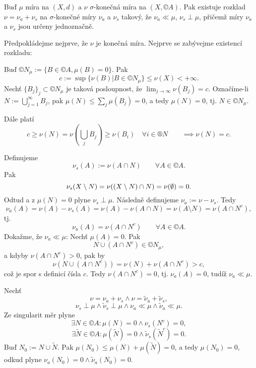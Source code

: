 \documentclass[12pt]{article}					%
\begin{document}

\begin{veta}
	Buď $\mu$ míra na $(X, d)$ a $\nu$ $\sigma$-konečná míra na $(X, ©A)$. Pak existuje rozklad $\nu = \nu_a + \nu_s$ na $\sigma$-konečné míry $\nu_a$ a $\nu_s$ takový, že $\nu_a \ll \mu$, $\nu_s \perp \mu$, přičemž míry $\nu_a$ a $\nu_s$ jsou určeny jednoznačně.

	\begin{dukazin}
		Předpokládejme nejprve, že $\nu$ je konečná míra. Nejprve se zabývejme existencí rozkladu:

		Buď $©N_\mu := \{B \in ©A, \mu(B) = 0\}$. Pak
		$$ c := \sup \{\nu(B) | B \in ©N_\mu\} ≤ \nu(X) < +∞. $$
		Nechť $\{B_j\}_j \subset ©N_\mu$ je taková posloupnost, že $\lim_{j \rightarrow ∞} \nu(B_j) = c$. Označíme-li $N := \bigcup_{j=1}^∞ B_j$, pak $\mu(N) ≤ \sum_j \mu(B_j) = 0$, a tedy $\mu(N) = 0$, tj. $N \in ©N_\mu$.

		Dále platí
		$$ c ≥ \nu(N) = \nu(\bigcup_j B_j) ≥ \nu(B_i) \quad \forall i \in ®N \qquad \implies \nu(N) = c. $$

		Definujeme
		$$ \nu_s(A) := \nu(A \cap N) \qquad \forall A \in ©A. $$
		Pak
		$$ \nu_s(X \setminus N) = \nu((X \setminus N) \cap N) = \nu(\emptyset) = 0. $$
		Odtud a z $\mu(N) = 0$ plyne $\nu_s \perp \mu$. Následně definujeme $\nu_a := \nu - \nu_s$. Tedy
		$$ \nu_a(A) = \nu(A) - \nu_s(A) = \nu(A) - \nu(A \cap N) = \nu(A \setminus N) = \nu(A \cap N^c), $$
		tj.
		$$ \nu_a(A) = \nu(A \cap N^c) \qquad \forall A \in ©A. $$
		Dokažme, že $\nu_a \ll \mu$: Nechť $\mu(A) = 0$. Pak
		$$ N \cup (A \cap N^c) \in ©N_\mu, $$
		a kdyby $\nu(A \cap N^c) > 0$, pak by
		$$ \nu(N \cup (A \cap N^c)) = \nu(N) + \nu(A \cap N^c) > c, $$
		což je spor s definicí čísla $c$. Tedy $\nu(A \cap N^c) = 0$, tj. $\nu_a(A) = 0$, tudíž $\nu_a \ll \mu$.
	\end{dukazin}

	\begin{dukazin}
		Nechť
		$$ \nu = \nu_a + \nu_s \land \nu = \tilde \nu_a + \tilde \nu_s, $$
		$$ \nu_s \perp \mu \land \tilde \nu_s \perp \mu \land \nu_a \ll \mu \land \tilde \nu_a \ll \mu. $$
		Ze singularit měr plyne
		$$ \exists N \in ©A: \mu(N) = 0 \land \nu_s(N^c) = 0, $$
		$$ \exists \tilde N \in ©A: \mu(\tilde N) = 0 \land \tilde \nu_s(\tilde N^c) = 0. $$
		Buď $N_0 := N \cup \tilde N$. Pak $\mu(N_0) ≤ \mu(N) + \mu(\tilde N) = 0$, a tedy $\mu(N_0) = 0$, odkud plyne $\nu_a(N_0) = 0 \land \tilde \nu_a(N_0) = 0$.


\end{dukazin}
\end{veta}
\end{document}
